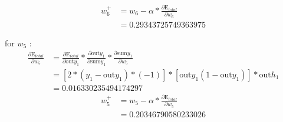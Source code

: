 \documentclass[a4paper, article, oneside, USenglish, IN5460]{memoir}
\begin{document}
{\begin{equation}
\begin{aligned}
w^+_6 &= w_6 - \alpha * \frac{\partial \text{E}_{total}  }{\partial w_6} \\
& =  0.29343725749363975
\end{aligned}
\end{equation}


\newline
for $w_5$ :
\begin{equation}
\begin{aligned}
\frac{\partial \text{E}_{total}  }{\partial w_5} &= \frac{\partial \text{E}_{total}}{\partial \text{out}y_1} *\frac{\partial  \text{out}y_1}{\partial \text{sum}y_1}*\frac{\partial \text{sum}y_1}{\partial  w_5}\\
&=[2*(y_1 -\text{out}y_1)*(-1)] * [\text{out}y_1(1-\text{out}y_1)] *\text{out}h_1 \\
& =  0.016330235494174297

\end{aligned}
\end{equation}
\begin{equation}
\begin{aligned}
w^+_5 &= w_5 - \alpha * \frac{\partial \text{E}_{total}  }{\partial w_5} \\
& = 0.20346790580233026
\end{aligned}
\end{equation}


}
\end{document}
